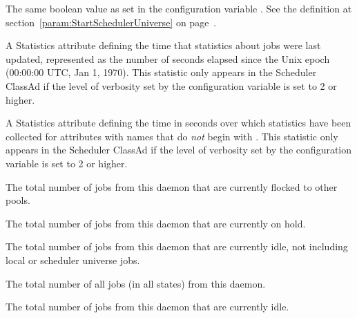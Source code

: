 \begin{description}
\item[\AdAttr{StartSchedulerUniverse}:] The same boolean value as set in the
  configuration variable .
  See the definition at section~\ref{param:StartSchedulerUniverse} on
  page~\pageref{param:StartSchedulerUniverse}.

\item[\AdAttr{StatsLastUpdateTime}:] A Statistics attribute defining
  the time that statistics about jobs were last updated,
  represented as the number of seconds elapsed since
  the Unix epoch (00:00:00 UTC, Jan 1, 1970).
  This statistic only appears in the Scheduler ClassAd if the level of
  verbosity set by the configuration variable 
  is set to 2 or higher.

\item[\AdAttr{StatsLifetime}:] A Statistics attribute defining
  the time in seconds over which statistics have been collected
  for attributes with names that do \emph{not} begin with .
  This statistic only appears in the Scheduler ClassAd if the level of
  verbosity set by the configuration variable 
  is set to 2 or higher.

\item[\AdAttr{TotalFlockedJobs}:] The total number of jobs from this
   daemon that are currently flocked to other pools.

\item[\AdAttr{TotalHeldJobs}:] The total number of jobs from this
   daemon that are currently on hold.

\item[\AdAttr{TotalIdleJobs}:] The total number of jobs from this
   daemon that are currently idle, not including
  local or scheduler universe jobs.

\item[\AdAttr{TotalJobAds}:] The total number of all jobs (in all 
  states) from this  daemon.

\item[\AdAttr{TotalLocalIdleJobs}:] The total number of 
    jobs from this
   daemon that are currently idle.


\end{description}
